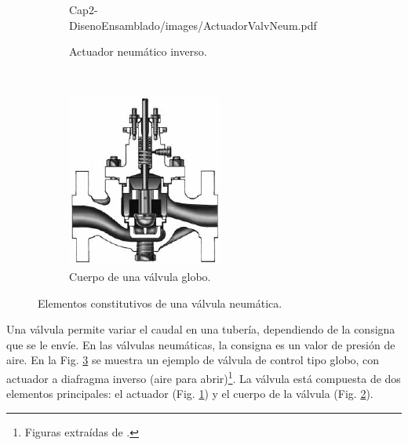\begin{figure}[t]
\begin{subfigure}[b]{0.37\textwidth}
	{Cap2-DisenoEnsamblado/images/ActuadorValvNeum.pdf}
                \caption{Actuador neumático inverso.}
                \label{fig:actuadorValv}
        \end{subfigure}%
        ~
        \begin{subfigure}[b]{0.37\textwidth}
\includegraphics[width=\textwidth]{Cap2-DisenoEnsamblado/images/ValvGlob.pdf}
                \caption{Cuerpo de una válvula globo.}
                \label{fig:cuerpoValv}
        \end{subfigure}
        \caption{Elementos constitutivos de una válvula neumática.}
        \label{fig:elementosValv}
\end{figure}

Una válvula permite variar el caudal en una tubería, dependiendo de la consigna
que se le envíe.
En las válvulas neumáticas, la consigna es un valor de presión de aire.
En la Fig. \ref{fig:elementosValv} se muestra un ejemplo de válvula de control
tipo globo, con actuador a diafragma inverso (aire para
abrir)\footnote{Figuras extraídas de \cite{bib:controlValveHandbook}.}.
La válvula está compuesta de dos elementos principales: el actuador
(Fig. \ref{fig:actuadorValv}) y el cuerpo de la válvula (Fig.
\ref{fig:cuerpoValv}).

